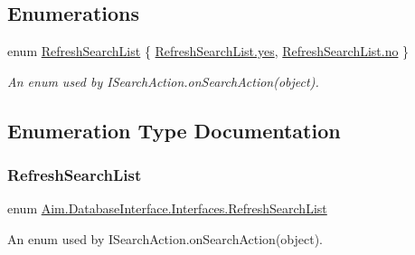 \subsection*{Enumerations}
\begin{DoxyCompactItemize}
\item 
enum \mbox{\hyperlink{namespace_aim_1_1_database_interface_1_1_interfaces_aafb04e83cb5c64ff04eaca9a548186eb}{Refresh\+Search\+List}} \{ \mbox{\hyperlink{namespace_aim_1_1_database_interface_1_1_interfaces_aafb04e83cb5c64ff04eaca9a548186ebaa6105c0a611b41b08f1209506350279e}{Refresh\+Search\+List.\+yes}}, 
\mbox{\hyperlink{namespace_aim_1_1_database_interface_1_1_interfaces_aafb04e83cb5c64ff04eaca9a548186eba7fa3b767c460b54a2be4d49030b349c7}{Refresh\+Search\+List.\+no}}
 \}
\begin{DoxyCompactList}\small\item\em An enum used by I\+Search\+Action.\+on\+Search\+Action(object). \end{DoxyCompactList}\end{DoxyCompactItemize}


\subsection{Enumeration Type Documentation}
\mbox{\label{namespace_aim_1_1_database_interface_1_1_interfaces_aafb04e83cb5c64ff04eaca9a548186eb}} 
\subsubsection{\texorpdfstring{Refresh\+Search\+List}{RefreshSearchList}}
{\footnotesize\ttfamily enum \mbox{\hyperlink{namespace_aim_1_1_database_interface_1_1_interfaces_aafb04e83cb5c64ff04eaca9a548186eb}{Aim.\+Database\+Interface.\+Interfaces.\+Refresh\+Search\+List}}\hspace{0.3cm}{\ttfamily [strong]}}



An enum used by I\+Search\+Action.\+on\+Search\+Action(object). 

